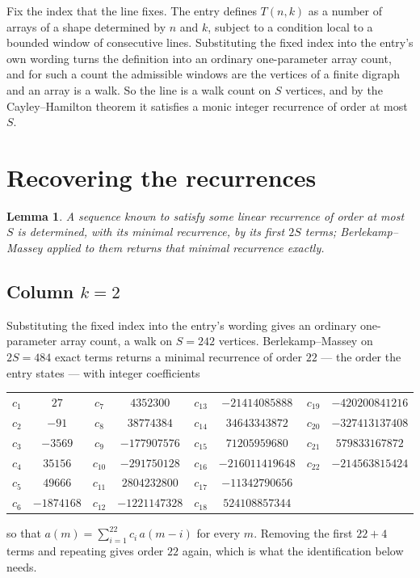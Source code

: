 \documentclass[11pt,a4paper]{article}
\theoremstyle{plain}
\newtheorem{lemma}[theorem]{Lemma}
\theoremstyle{definition}
\begin{document}
Fix the index that the line fixes. The entry defines $T(n,k)$ as a number of arrays of a shape
determined by $n$ and $k$, subject to a condition local to a bounded window of consecutive
lines. Substituting the fixed index into the entry's own wording turns the definition into an
ordinary one-parameter array count, and for such a count the admissible windows are the
vertices of a finite digraph and an array is a walk. So the line is a walk count on $S$
vertices, and by the Cayley--Hamilton theorem it satisfies a monic integer recurrence of order
at most $S$.

\section{Recovering the recurrences}

\begin{lemma}\label{lem:bm}
A sequence known to satisfy some linear recurrence of order at most $S$ is determined, with its
minimal recurrence, by its first $2S$ terms; Berlekamp--Massey applied to them returns that
minimal recurrence exactly.
\end{lemma}

\subsection*{Column $k=2$}
Substituting the fixed index into the entry's wording gives an ordinary one-parameter array
count, a walk on $S=242$ vertices. Berlekamp--Massey on $2S=484$ exact terms
returns a minimal recurrence of order $22$ --- the order the entry states --- with
integer coefficients
\begin{center}\small\begin{tabular}{cccccccc}
$c_{1}$ & $27$ & $c_{7}$ & $4352300$ & $c_{13}$ & $-21414085888$ & $c_{19}$ & $-420200841216$ \\
$c_{2}$ & $-91$ & $c_{8}$ & $38774384$ & $c_{14}$ & $34643343872$ & $c_{20}$ & $-327413137408$ \\
$c_{3}$ & $-3569$ & $c_{9}$ & $-177907576$ & $c_{15}$ & $71205959680$ & $c_{21}$ & $579833167872$ \\
$c_{4}$ & $35156$ & $c_{10}$ & $-291750128$ & $c_{16}$ & $-216011419648$ & $c_{22}$ & $-214563815424$ \\
$c_{5}$ & $49666$ & $c_{11}$ & $2804232800$ & $c_{17}$ & $-11342790656$ &  &  \\
$c_{6}$ & $-1874168$ & $c_{12}$ & $-1221147328$ & $c_{18}$ & $524108857344$ &  &  \\
\end{tabular}\end{center}
so that $a(m)=\sum_{i=1}^{22}c_i\,a(m-i)$ for every $m$. Removing the first
$22+4$ terms and repeating gives order $22$ again, which is what the
identification below needs.
\end{document}

